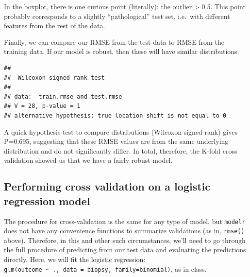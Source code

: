 \documentclass[]{article}
\newenvironment{Shaded}{\begin{snugshade}}{\end{snugshade}}
\newcommand{\KeywordTok}[1]{\textcolor[rgb]{0.13,0.29,0.53}{\textbf{#1}}}
\newcommand{\DataTypeTok}[1]{\textcolor[rgb]{0.13,0.29,0.53}{#1}}
\newcommand{\StringTok}[1]{\textcolor[rgb]{0.31,0.60,0.02}{#1}}
\newcommand{\OperatorTok}[1]{\textcolor[rgb]{0.81,0.36,0.00}{\textbf{#1}}}
\newcommand{\NormalTok}[1]{#1}
\begin{document}
In the boxplot, there is one curious point (literally): the outlier
\textgreater{} 0.5. This point probably corresponds to a slightly
``pathological'' test set, i.e.~with different features from the rest of
the data.

Finally, we can compare our RMSE from the test data to RMSE from the
training data. If our model is robust, then these will have similar
distributions:

\begin{Shaded}
\end{Shaded}

\begin{verbatim}
## 
##  Wilcoxon signed rank test
## 
## data:  train.rmse and test.rmse
## V = 28, p-value = 1
## alternative hypothesis: true location shift is not equal to 0
\end{verbatim}

A quick hypothesis test to compare distributions (Wilcoxon signed-rank)
gives P=0.695, suggesting that these RMSE values are from the same
underlying distribution and do not significantly differ. In total,
therefore, the K-fold cross validation showed us that we have a fairly
robust model.

\subsection{Performing cross validation on a logistic regression
model}\label{performing-cross-validation-on-a-logistic-regression-model}

The procedure for cross-validation is the same for any type of model,
but \texttt{modelr} does not have any convenience functions to summarize
validations (as in, \texttt{rmse()} above). Therefore, in this and other
such circumstances, we'll need to go through the full procedure of
predicting from our test data and evaluating the predictions directly.
Here, we will fit the logistic regression:
\texttt{glm(outcome\ \textasciitilde{}\ .,\ data\ =\ biopsy,\ family=binomial)},
as in class.
\end{document}
